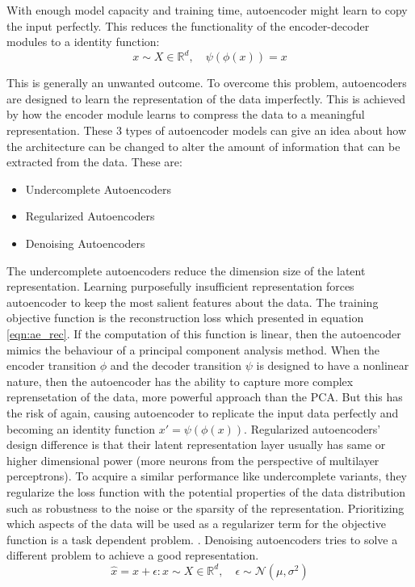 With enough model capacity and training time, autoencoder might learn to copy the input perfectly.
This reduces the functionality of the encoder-decoder modules to a identity function:
$$
 x \sim X \in \mathbb{R}^d, \quad \psi(\phi(x)) = x
$$

This is generally an unwanted outcome. To overcome this problem, autoencoders are designed to learn the
representation of the data imperfectly. \cite{Goodfellow-et-al-2016} This is achieved by how the
encoder module learns to compress the data to a meaningful representation. These 3 types of
autoencoder models can give an idea about how the architecture can be changed to alter the amount of
information that can be extracted from the data. These are:

\begin{itemize}
    \item Undercomplete Autoencoders
    \item Regularized Autoencoders
    \item Denoising Autoencoders
\end{itemize}

The undercomplete autoencoders reduce the dimension size of the latent representation. Learning
purposefully insufficient representation forces autoencoder to keep the most salient features about
the data. The training objective function is the reconstruction loss which presented in equation
\ref{eqn:ae_rec}. If the computation of this function is linear, then the autoencoder mimics the
behaviour of a principal component analysis method. When the encoder transition $\phi$ and the
decoder transition $\psi$ is designed to have a nonlinear nature, then the autoencoder has the
ability to capture more complex reprensetation of the data, more powerful approach than the PCA. But
this has the risk of again, causing autoencoder to replicate the input data perfectly and becoming
an identity function $x' = \psi(\phi(x))$. Regularized autoencoders' design difference is that their
latent representation layer usually has same or higher dimensional power (more neurons from the
perspective of multilayer perceptrons). To acquire a similar performance like undercomplete
variants, they regularize the loss function  with the potential properties of the data distribution
such as robustness to the noise or the sparsity of the representation. Prioritizing which aspects of
the data will be used as a regularizer term for the objective function is a task dependent problem.
\cite{Goodfellow-et-al-2016}. Denoising autoencoders tries to solve a different problem to achieve a
good representation. 
$$
\hat{x} = x + \epsilon : x \sim X \in \mathbb{R}^d ,\quad \epsilon \sim \mathcal{N}(\mu, \sigma^2)
$$

